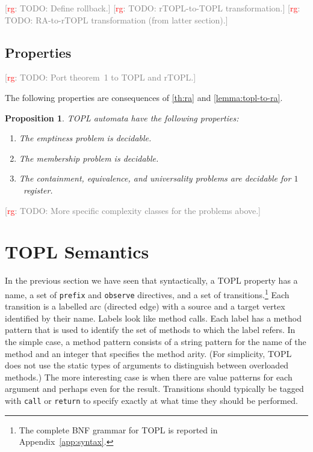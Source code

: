 \documentclass[9pt, preprint]{sigplanconf} %
\newcommand{\noterg}[2]{\textcolor{gray}{[\textcolor{red}{#1}: #2]}}
\newcommand{\rg}[1]{\noterg{rg}{#1}}
\newtheorem{proposition}{Proposition}
\theoremstyle{definition}
\theoremstyle{remark}
\begin{document}
\rg{TODO: Define rollback.}
\rg{TODO: rTOPL-to-TOPL transformation.}
\rg{TODO: RA-to-rTOPL transformation (from latter section).}

\subsection{Properties} %

\rg{TODO: Port theorem~1 to TOPL and rTOPL.}


The following properties are consequences of \autoref{th:ra} and \autoref{lemma:topl-to-ra}.

\begin{proposition}
TOPL automata have the following properties:
\begin{enumerate}
\item The emptiness problem is decidable.
\item The membership problem is decidable.
\item The containment, equivalence, and universality problems are decidable for $1$~register.
\end{enumerate}
\end{proposition}
\rg{TODO: More specific complexity classes for the problems above.}

\section{TOPL  Semantics}\label{sec:semantics} %
In the previous section we have seen that syntactically, a TOPL property has a name, a set of {\tt prefix} and {\tt observe} directives, and a set of transitions.\footnote{The complete BNF grammar for TOPL is reported in Appendix~\ref{app:syntax}.}
Each transition is a labelled arc (directed edge) with a source and a target vertex identified by their name.
Labels look like method calls.
Each label has a method pattern that is used to identify the set of methods to which the label refers.
In the simple case, a method pattern consists of a string pattern for the name of the method and an integer that specifies the method arity.
(For simplicity, TOPL does not use the static types of arguments to distinguish between overloaded methods.)
The more interesting case is when there are value patterns for each argument and perhaps even for the result.
Transitions should typically be tagged with \texttt{call} or \texttt{return} to specify exactly at what time they should be performed.
\end{document}
